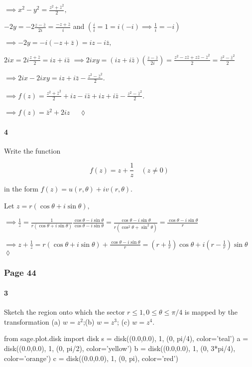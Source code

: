 \documentclass{article}
\begin{document}
$\implies x^2 -y^2 = \frac{z^2 +\bar{z}^2}{2},$

$-2y = -2\frac{z-\bar{z}}{2i} = \frac{-z+\bar{z}}{i}$ and $(\frac{i}{i}
= 1 = i(-i) \implies \frac{1}{i} = -i)$

$\implies -2y = -i(-z+\bar{z}) = iz-i\bar{z},$

$2ix = 2i\frac{z+\bar{z}}{2} = iz+i\bar{z}$
$ \implies 2ixy =
(iz+i\bar{z})(\frac{z-\bar{z}}{2i}) = \frac{z^2-z\bar{z} +z\bar{z}
  -\bar{z}^2}{2} = \frac{z^2 -\bar{z}^2}{2}$

$\implies 2ix -2ixy = iz+i\bar{z} -\frac{z^2 -\bar{z}^2}{2}.$

$\implies f(z) = \frac{z^2 +\bar{z}^2}{2} +iz -i\bar{z} + iz+i\bar{z}
-\frac{z^2 -\bar{z}^2}{2}. $

$\implies f(z) = \bar{z}^2 +2iz\quad $ $\lozenge$
\newpage
\paragraph{4} Write the function

\[f(z) = z + \frac{1}{z} \quad (z\neq 0)\]

in the form $f(z) = u(r,\theta) +iv(r,\theta).$


Let $z = r(\cos{\theta} +i\sin{\theta}),$

$\implies \frac{1}{z} = \frac{1}{r(\cos{\theta}
  +i\sin{\theta})}\frac{\cos{\theta} -i\sin{\theta}}{\cos{\theta}
  -i\sin{\theta}} =  \frac{\cos{\theta}
  -i\sin{\theta}}{r(\cos^2{\theta} +\sin^2{\theta})} =\frac{\cos{\theta}
  -i\sin{\theta}}{r}$

$\implies z +\frac{1}{z} = r(\cos{\theta} +i\sin{\theta}) + \frac{\cos{\theta}
  -i\sin{\theta}}{r} =
(r+\frac{1}{r})\cos{\theta}+i(r-\frac{1}{r})\sin{\theta}$$\lozenge$

\subsubsection*{Page 44}

\paragraph{3} Sketch the region onto which the sector $r\leq 1, 0\leq
\theta \leq \pi/4$ is mapped by the transformation (a) $w = z^2$;(b)
$w= z^3$; (c) $w = z^4$.

\begin{sagesilent}
  from sage.plot.disk import disk
  s = disk((0.0,0.0), 1, (0, pi/4), color='teal')
  a = disk((0.0,0.0), 1, (0, pi/2), color='yellow')
  b = disk((0.0,0.0), 1, (0, 3*pi/4), color='orange')
  c = disk((0.0,0.0), 1, (0, pi), color='red')
\end{sagesilent}
\end{document}
